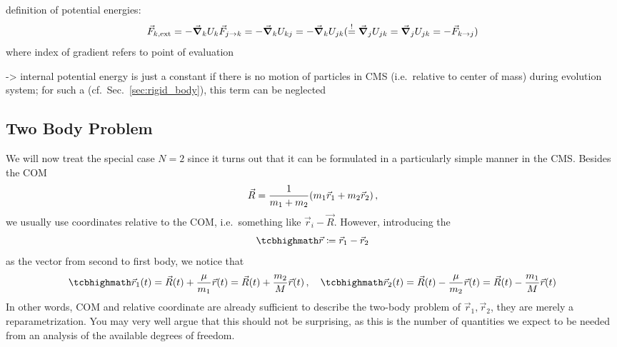 \documentclass[../class_mech_main.tex]{subfiles}
\begin{document}
definition of potential energies:
\begin{equation}
	\vec{F}_{k, \mathrm{ext}} = - \grad_k U_k
	\vec{F}_{j \rightarrow k} = - \grad_k U_{kj} = - \grad_k U_{jk} (\overset{!}{=} \grad_j U_{jk} = \grad_j U_{jk} = - \vec{F}_{k \rightarrow j})
\end{equation}
where index of gradient refers to point of evaluation


-> internal potential energy is just a constant if there is no motion of particles in CMS (i.e.~relative to center of mass) during evolution system; for such a  (cf.~Sec.~\ref{sec:rigid_body}), this term can be neglected



	    \subsection{Two Body Problem}
We will now treat the special case $N = 2$ since it turns out that it can be formulated in a particularly simple manner in the CMS. Besides the COM
\begin{equation}
	\vec{R} = \frac{1}{m_1 + m_2} \qty(m_1 \vec{r}_1 + m_2 \vec{r}_2)
	\, ,
\end{equation}
we usually use coordinates relative to the COM, i.e.~something like $\vec{r}_i - \vec{R}$. However, introducing the 
\begin{equation}\label{eq:com_relative_coord}
	\eqbox{
		\vec{r} \coloneqq \vec{r}_1 - \vec{r}_2
	}
\end{equation}
as the vector from second to first body, we notice that
\begin{equation}\label{eq:trafo_com_components}
	\eqbox{
		\vec{r}_1(t) = \vec{R}(t) + \frac{\mu}{m_1} \vec{r}(t) = \vec{R}(t) + \frac{m_2}{M} \vec{r}(t)
	}
	\, , \quad
	\eqbox{
		\vec{r}_2(t) = \vec{R}(t) - \frac{\mu}{m_2} \vec{r}(t) = \vec{R}(t) - \frac{m_1}{M} \vec{r}(t)
	}
\end{equation}
In other words, COM and relative coordinate are already sufficient to describe the two-body problem of $\vec{r}_1, \vec{r}_2$, they are merely a reparametrization. You may very well argue that this should not be surprising, as this is the number of quantities we expect to be needed from an analysis of the available degrees of freedom.
\end{document}
